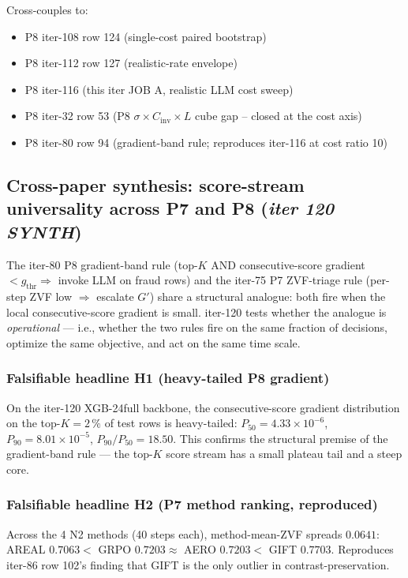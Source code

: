 \documentclass{article}
\begin{document}
Cross-couples to:
\begin{itemize}
  \item P8 iter-108 row 124 (single-cost paired bootstrap)
  \item P8 iter-112 row 127 (realistic-rate envelope)
  \item P8 iter-116 (this iter JOB A, realistic LLM cost sweep)
  \item P8 iter-32 row 53 (P8 $\sigma \times C_{\mathrm{inv}} \times L$
        cube gap -- closed at the cost axis)
  \item P8 iter-80 row 94 (gradient-band rule; reproduces iter-116
        at cost ratio 10)
\end{itemize} \subsection{Cross-paper synthesis: score-stream universality across P7 and P8
  (\textit{iter 120 SYNTH})}
\label{sec:synth-score-stream-universality}

The iter-80 P8 gradient-band rule (top-$K$ AND consecutive-score gradient
$<g_\mathrm{thr}\Rightarrow$ invoke LLM on fraud rows) and the iter-75 P7
ZVF-triage rule (per-step ZVF low $\Rightarrow$ escalate $G'$) share a
structural analogue: both fire when the local consecutive-score gradient
is small.  iter-120 tests whether the analogue is \emph{operational} ---
i.e., whether the two rules fire on the same fraction of decisions,
optimize the same objective, and act on the same time scale.

\subsubsection{Falsifiable headline H1 (heavy-tailed P8 gradient)}
On the iter-120 XGB-24full backbone, the consecutive-score gradient
distribution on the top-$K{=}2\,\%$ of test rows is heavy-tailed:
$P_{50}{=}4.33{\times}10^{-6}$, $P_{90}{=}8.01{\times}10^{-5}$,
\textbf{$P_{90}/P_{50}{=}18.50$}.  This confirms the structural premise
of the gradient-band rule --- the top-$K$ score stream has a small
plateau tail and a steep core.

\subsubsection{Falsifiable headline H2 (P7 method ranking, reproduced)}
Across the 4 N2 methods (40 steps each), method-mean-ZVF spreads
$0.0641$:
AREAL $0.7063 < $ GRPO $0.7203 \approx $ AERO $0.7203 < $ GIFT
$0.7703$.  Reproduces iter-86 row 102's finding that GIFT is the only
outlier in contrast-preservation.
\end{document}
